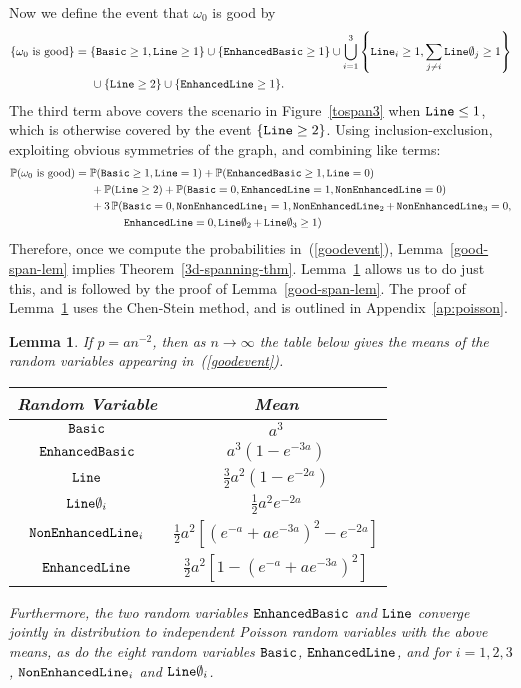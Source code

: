 \documentclass{amsart}
\newcommand{\prob}{\mathbb{P}}
\newcommand{\basic}{\operatorname{\tt Basic}}
\newcommand{\lin}{\operatorname{\tt Line}}
\newcommand{\oline}{\operatorname{\tt  Line\emptyset}}
\newcommand{\eline}{\operatorname{\tt Enhanced Line}}
\newcommand{\ebasic}{\operatorname{\tt Enhanced Basic}}
\newcommand{\neline}{\operatorname{\tt NonEnhancedLine}}
\newcommand{\good}{\text{good}}
\numberwithin{equation}{section}
\newcommand\Ts{\rule{0pt}{2.8ex}}
\newcommand\Bs{\rule[-1.6ex]{0pt}{0pt}}
\newtheorem{lemma}[theorem]{Lemma}
\theoremstyle{definition}
\theoremstyle{remark}
\begin{document}
Now we define the event that $\omega_0$ is good by
\begin{align*}
\{\omega_0 \text{ is } \good\} &= \{\basic\geq 1, \lin \geq 1\} \cup \{ \ebasic \geq 1 \} \cup \bigcup_{i=1}^3 \left\{\lin_i \geq 1, \sum_{j\neq i} \oline_j \geq 1\right \} \\
&\hspace{.5cm}  \cup \{\lin \geq 2\} \cup \{\eline\geq 1\}.
\end{align*}
The third term above covers the scenario in Figure~\ref{tospan3} when $\lin\leq 1$, which is otherwise covered by the event $\{\lin \geq 2\}$.  Using inclusion-exclusion, exploiting obvious symmetries of the graph, and combining like terms:
\begin{equation}
 \label{goodevent}
\begin{aligned}
\prob(\omega_0 \text{ is } \good) &= \prob(\basic \geq 1, \lin=1) + \prob({\ebasic \geq 1, \lin=0})  \\
 &\hspace{.5cm} + \prob(\lin \geq 2) + \prob(\basic=0,\eline=1, \neline=0) \\
 &\hspace{.5cm} + 3\, \prob(\basic=0,\neline_1=1,\neline_2+\neline_3=0,\\
 &\hspace{1.5cm} \eline=0,\oline_2+\oline_3\geq 1)
\end{aligned}
\end{equation}
Therefore, once we compute the probabilities in~(\ref{goodevent}), Lemma~\ref{good-span-lem} implies Theorem~\ref{3d-spanning-thm}.  Lemma~\ref{3d-poisson-lem} allows us to do just this, and is followed by the proof of Lemma~\ref{good-span-lem}.  The proof of Lemma~\ref{3d-poisson-lem} uses the Chen-Stein method, and is outlined in Appendix~\ref{ap:poisson}.
\begin{lemma}
\label{3d-poisson-lem}
If $p = an^{-2}$, then as $n\to\infty$ the table below gives the means of the random variables appearing in~(\ref{goodevent}).
\begin{center}
\begin{tabular}{|c|c|}
\hline Random Variable & Mean \\ \hline \hline
$\basic$ & $a^3$ \Ts\Bs \\ \hline
$\ebasic$ & $a^3 (1 - e^{-3a})$   \Ts\Bs\\ \hline
$\lin$ & $\frac{3}{2} a^2 (1 - e^{-2a})$ \Ts\Bs \\ \hline
$\oline_i$ & $\frac{1}{2} a^2 e^{-2a}$ \Ts\Bs \\ \hline
\Bs \Ts $\neline_i$ & $\frac{1}{2}a^2 \left[\left(e^{-a}+ae^{-3a}\right)^2 - e^{-2a}\right]$  \\ \hline
\Bs \Ts $\eline$ & $\frac{3}{2}a^2 \left[1 - \left(e^{-a}+ae^{-3a}\right)^2 \right]$  \\ \hline
\end{tabular}
\end{center}
Furthermore, the two random variables $\ebasic$ and $\lin$ converge jointly in distribution to independent Poisson random variables with the above means, as do the eight random variables $\basic$, $\eline$, and for $i=1,2,3$, $\neline_i$ and $\oline_i$.
\end{lemma}
\end{document}
